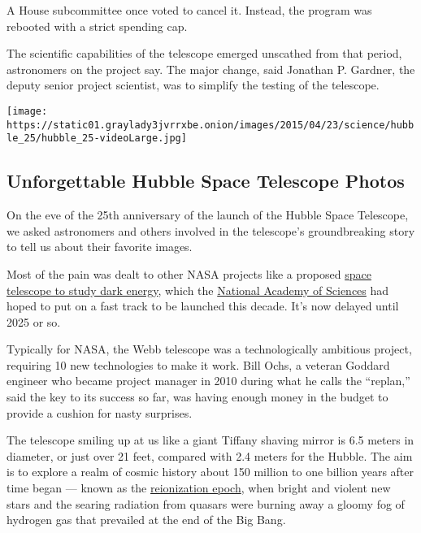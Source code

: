 A House subcommittee once voted to cancel it. Instead, the program was
rebooted with a strict spending cap.

The scientific capabilities of the telescope emerged unscathed from that
period, astronomers on the project say. The major change, said Jonathan
P. Gardner, the deputy senior project scientist, was to simplify the
testing of the telescope.

\href{https://www.nytimes3xbfgragh.onion/interactive/2015/04/23/science/space/unforgettable-hubble-space-telescope-photos.html}{}

\texttt{[image: https://static01.graylady3jvrrxbe.onion/images/2015/04/23/science/hubble\_25/hubble\_25-videoLarge.jpg]}

\hypertarget{unforgettable-hubble-space-telescope-photos}{%
\subsection{Unforgettable Hubble Space Telescope
Photos}\label{unforgettable-hubble-space-telescope-photos}}

On the eve of the 25th anniversary of the launch of the Hubble Space
Telescope, we asked astronomers and others involved in the telescope's
groundbreaking story to tell us about their favorite images.

Most of the pain was dealt to other NASA projects like a proposed
\href{http://www.nytimes3xbfgragh.onion/2011/01/04/science/space/04telescope.html}{space
telescope to study dark energy}, which the
\href{http://nationalacademyofsciences.org/?referrer=https://www.google.com/?referrer=http://nationalacademyofsciences.org/}{National
Academy of Sciences} had hoped to put on a fast track to be launched
this decade. It's now delayed until 2025 or so.

Typically for NASA, the Webb telescope was a technologically ambitious
project, requiring 10 new technologies to make it work. Bill Ochs, a
veteran Goddard engineer who became project manager in 2010 during what
he calls the ``replan,'' said the key to its success so far, was having
enough money in the budget to provide a cushion for nasty surprises.

The telescope smiling up at us like a giant Tiffany shaving mirror is
6.5 meters in diameter, or just over 21 feet, compared with 2.4 meters
for the Hubble. The aim is to explore a realm of cosmic history about
150 million to one billion years after time began --- known as the
\href{http://www.haystack.mit.edu/ast/science/epoch/}{reionization
epoch}, when bright and violent new stars and the searing radiation from
quasars were burning away a gloomy fog of hydrogen gas that prevailed at
the end of the Big Bang.


